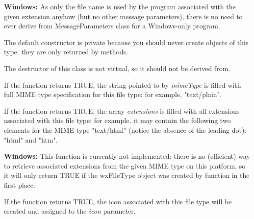 {\bf Windows:} As only the file name is used by the program associated with the
given extension anyhow (but no other message parameters), there is no need to
ever derive from MessageParameters class for a Windows-only program.

\label{wxfiletypewxfiletype}


The default constructor is private because you should never create objects of
this type: they are only returned by  methods.

\label{wxfiletypedtor}


The destructor of this class is not virtual, so it should not be derived from.

\label{wxfiletypegetmimetype}


If the function returns TRUE, the string pointed to by {\it mimeType} is filled
with full MIME type specification for this file type: for example, "text/plain".

\label{wxfiletypegetextensions}


If the function returns TRUE, the array {\it extensions} is filled
with all extensions associated with this file type: for example, it may
contain the following two elements for the MIME type "text/html" (notice the
absence of the leading dot): "html" and "htm".

{\bf Windows:} This function is currently not implemented: there is no
(efficient) way to retrieve associated extensions from the given MIME type on
this platform, so it will only return TRUE if the wxFileType object was created
by  
function in the first place.

\label{wxfiletypegeticon}


If the function returns TRUE, the icon associated with this file type will be
created and assigned to the {\it icon} parameter.

